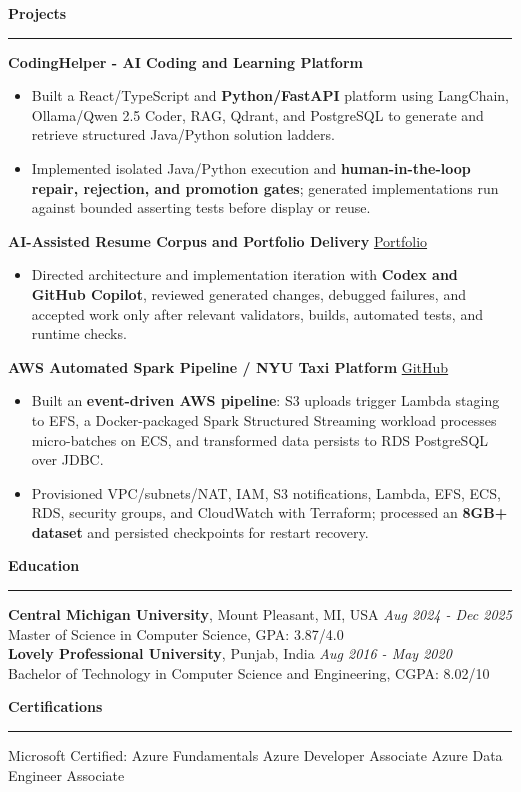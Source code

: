 \documentclass[11pt,letterpaper]{article}
\newcommand{\ressection}[1]{\Needspace{6\baselineskip}\vspace{8pt}\par\textbf{#1}\par\vspace{2pt}\hrule\vspace{5pt}}
\begin{document}
\ressection{Projects}
\textbf{CodingHelper - AI Coding and Learning Platform}
\begin{itemize}
  \item Built a React/TypeScript and \textbf{Python/FastAPI} platform using LangChain, Ollama/Qwen 2.5 Coder, RAG, Qdrant, and PostgreSQL to generate and retrieve structured Java/Python solution ladders.
  \item Implemented isolated Java/Python execution and \textbf{human-in-the-loop repair, rejection, and promotion gates}; generated implementations run against bounded asserting tests before display or reuse.
\end{itemize}
\vspace{2pt}
\textbf{AI-Assisted Resume Corpus and Portfolio Delivery} \hfill \href{https://github.com/preferablehuman/portfolio}{Portfolio}
\begin{itemize}
  \item Directed architecture and implementation iteration with \textbf{Codex and GitHub Copilot}, reviewed generated changes, debugged failures, and accepted work only after relevant validators, builds, automated tests, and runtime checks.
\end{itemize}
\vspace{2pt}
\textbf{AWS Automated Spark Pipeline / NYU Taxi Platform} \hfill \href{https://github.com/preferablehuman/AWS-automated-spark-pipeline}{GitHub}
\begin{itemize}
  \item Built an \textbf{event-driven AWS pipeline}: S3 uploads trigger Lambda staging to EFS, a Docker-packaged Spark Structured Streaming workload processes micro-batches on ECS, and transformed data persists to RDS PostgreSQL over JDBC.
  \item Provisioned VPC/subnets/NAT, IAM, S3 notifications, Lambda, EFS, ECS, RDS, security groups, and CloudWatch with Terraform; processed an \textbf{8GB+ dataset} and persisted checkpoints for restart recovery.
\end{itemize}

\ressection{Education}
\textbf{Central Michigan University}, Mount Pleasant, MI, USA \hfill \textit{Aug 2024 - Dec 2025}\\
Master of Science in Computer Science, GPA: 3.87/4.0\\
\textbf{Lovely Professional University}, Punjab, India \hfill \textit{Aug 2016 - May 2020}\\
Bachelor of Technology in Computer Science and Engineering, CGPA: 8.02/10

\ressection{Certifications}
Microsoft Certified: Azure Fundamentals \textbar{} Azure Developer Associate \textbar{} Azure Data Engineer Associate
\end{document}
